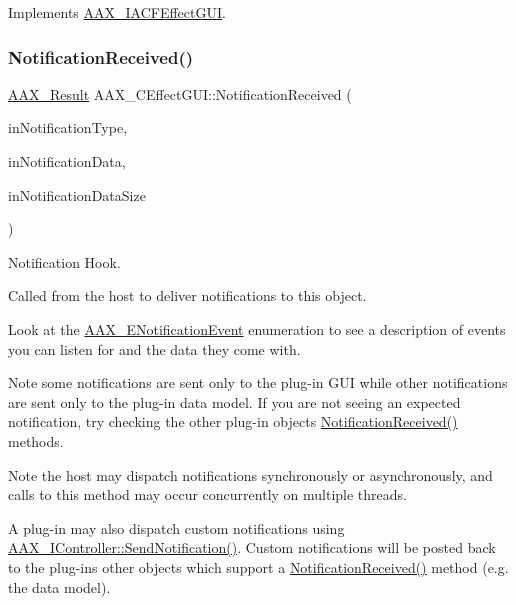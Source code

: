 Implements \mbox{\hyperlink{a01665_ab7d1c3c80a60637f9a9fd1860fe418cb}{A\+A\+X\+\_\+\+I\+A\+C\+F\+Effect\+G\+UI}}.

\mbox{\label{a01477_af00b27d16a45bccf632a445491c56833}} 
\subsubsection{\texorpdfstring{NotificationReceived()}{NotificationReceived()}}
{\footnotesize\ttfamily \mbox{\hyperlink{a00392_a4d8f69a697df7f70c3a8e9b8ee130d2f}{A\+A\+X\+\_\+\+Result}} A\+A\+X\+\_\+\+C\+Effect\+G\+U\+I\+::\+Notification\+Received (\begin{DoxyParamCaption}\item[{\mbox{\hyperlink{a00392_ac678f9c1fbcc26315d209f71a147a175}{A\+A\+X\+\_\+\+C\+Type\+ID}}}]{in\+Notification\+Type,  }\item[{const void $\ast$}]{in\+Notification\+Data,  }\item[{uint32\+\_\+t}]{in\+Notification\+Data\+Size }\end{DoxyParamCaption})\hspace{0.3cm}{\ttfamily [virtual]}}



Notification Hook. 

Called from the host to deliver notifications to this object.

Look at the \mbox{\hyperlink{a00491_afab5ea2cfd731fc8f163b6caa685406e}{A\+A\+X\+\_\+\+E\+Notification\+Event}} enumeration to see a description of events you can listen for and the data they come with.


\begin{DoxyItemize}
\item \begin{DoxyNote}{Note}
some notifications are sent only to the plug-\/in G\+UI while other notifications are sent only to the plug-\/in data model. If you are not seeing an expected notification, try checking the other plug-\/in objects\textquotesingle{} {\ttfamily \mbox{\hyperlink{a01477_af00b27d16a45bccf632a445491c56833}{Notification\+Received()}}} methods.
\end{DoxyNote}

\item \begin{DoxyNote}{Note}
the host may dispatch notifications synchronously or asynchronously, and calls to this method may occur concurrently on multiple threads.
\end{DoxyNote}
A plug-\/in may also dispatch custom notifications using \mbox{\hyperlink{a01789_a0384f820cecf8cf7671057060bf5ba4f}{A\+A\+X\+\_\+\+I\+Controller\+::\+Send\+Notification()}}. Custom notifications will be posted back to the plug-\/in\textquotesingle{}s other objects which support a {\ttfamily \mbox{\hyperlink{a01477_af00b27d16a45bccf632a445491c56833}{Notification\+Received()}}} method (e.\+g. the data model).
\end{DoxyItemize}


